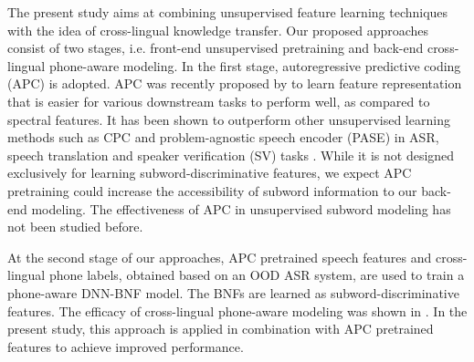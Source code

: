 \documentclass[a4paper]{article}
\begin{document}
The present study aims at combining unsupervised feature learning techniques with the idea of cross-lingual   knowledge transfer. Our proposed approaches consist of two stages, i.e. front-end unsupervised pretraining and back-end cross-lingual phone-aware  modeling. 
In the first stage, autoregressive predictive coding (APC) is adopted.
APC was recently proposed by \cite{Chung2019} to  learn feature representation that is easier  for  various downstream tasks to perform well, as compared to spectral features. 
It has been shown to outperform other  unsupervised learning methods such as CPC \cite{oord2018cpc} and problem-agnostic speech encoder (PASE) \cite{Pascual2019} in ASR, speech translation and speaker verification (SV)  tasks \cite{Chung2019generative}.
While it is not designed exclusively for learning subword-discriminative features, we expect APC 
pretraining could increase the accessibility of subword information to our back-end modeling.
The effectiveness of APC in unsupervised subword modeling has not been studied before.

At the second stage of our approaches, APC pretrained speech features and cross-lingual phone labels, obtained based on an OOD ASR system,  are used to train a phone-aware DNN-BNF model. The BNFs are learned  as subword-discriminative features. The efficacy of cross-lingual phone-aware  modeling was shown in \cite{feng2018exploiting,feng2019_TASLP}. In the present study, this approach is applied in combination with APC pretrained features to achieve improved performance.
\end{document}

